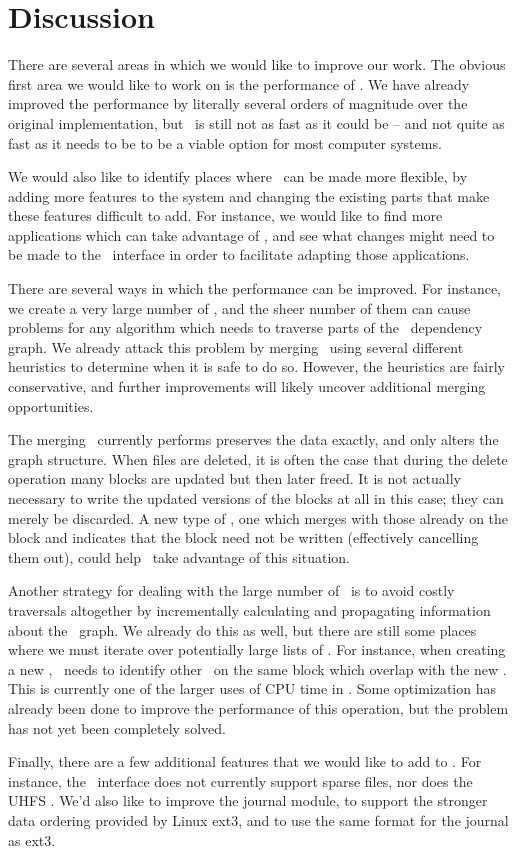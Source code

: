 \section {Discussion}
\label{sec:discussion}

There are several areas in which we would like to improve our work. The obvious
first area we would like to work on is the performance of \Kudos. We have
already improved the performance by literally several orders of magnitude over
the original implementation, but \Kudos\ is still not as fast as it could be --
and not quite as fast as it needs to be to be a viable option for most computer
systems.

We would also like to identify places where \Kudos\ can be made more flexible,
by adding more features to the system and changing the existing parts that make
these features difficult to add. For instance, we would like to find more
applications which can take advantage of \patchgroups, and see what changes might
need to be made to the \patchgroup\ interface in order to facilitate adapting those
applications.

There are several ways in which the performance can be improved. For instance,
we create a very large number of \patches, and the sheer number of them can
cause problems for any algorithm which needs to traverse parts of the \patch\
dependency graph. We already attack this problem by merging \patches\ using
several different heuristics to determine when it is safe to do so. However, the
heuristics are fairly conservative, and further improvements will likely uncover
additional merging opportunities.

The merging \Kudos\ currently performs preserves the data exactly, and only
alters the graph structure. When files are deleted, it is often the case that
during the delete operation many blocks are updated but then later freed. It is
not actually necessary to write the updated versions of the blocks at all in
this case; they can merely be discarded. A new type of \patch, one which merges
with those already on the block and indicates that the block need not be written
(effectively cancelling them out), could help \Kudos\ take advantage of this
situation.

Another strategy for dealing with the large number of \patches\ is to avoid
costly traversals altogether by incrementally calculating and propagating
information about the \patch\ graph. We already do this as well, but there are
still some places where we must iterate over potentially large lists of
\patches. For instance, when creating a new \patch, \Kudos\ needs to identify
other \patches\ on the same block which overlap with the new \patch. This is
currently one of the larger uses of CPU time in \Kudos. Some optimization has
already been done to improve the performance of this operation, but the problem
has not yet been completely solved.

Finally, there are a few additional features that we would like to add to
\Kudos. For instance, the \LFS\ interface does not currently support sparse
files, nor does the UHFS \module. We'd also like to improve the journal module,
to support the stronger data ordering provided by Linux ext3, and to use the
same format for the journal as ext3.
